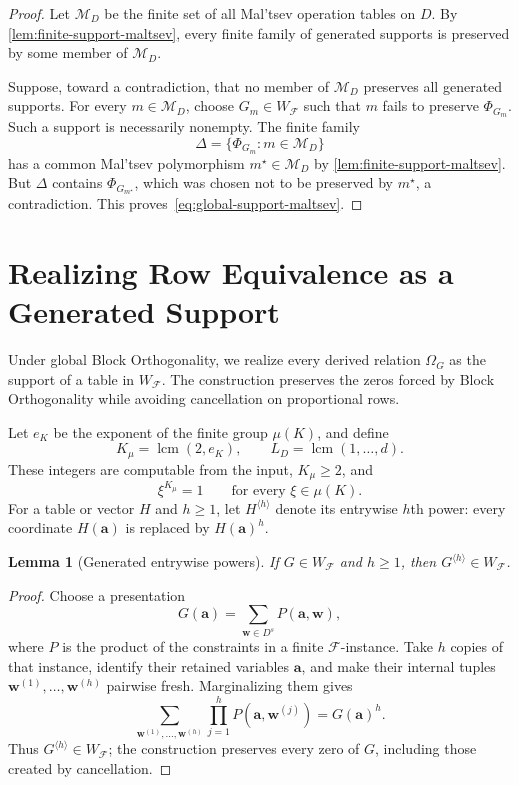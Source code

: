 \documentclass[11pt]{article}
\theoremstyle{plain}
\newtheorem{lemma}[lemma]{Lemma}
\theoremstyle{definition}
\theoremstyle{remark}
\newcommand{\cF}{\mathcal F}
\newcommand{\SuppRel}[1]{\Phi_{#1}}
\newcommand{\RowEq}[1]{\Omega_{#1}}
\newcommand{\Pow}[2]{#1^{\langle #2\rangle}}
\DeclareMathOperator{\lcm}{lcm}
\begin{document}
\begin{proof}
Let $\mathcal M_D$ be the finite set of all Mal'tsev operation tables on
$D$.  By \cref{lem:finite-support-maltsev}, every finite family of generated
supports is preserved by some member of $\mathcal M_D$.

Suppose, toward a contradiction, that no member of $\mathcal M_D$ preserves
all generated supports.  For every $m\in\mathcal M_D$, choose
$G_m\in W_{\cF}$ such that $m$ fails to preserve $\SuppRel{G_m}$.  Such a
support is necessarily nonempty.  The finite family
\[
  \Delta=\{\SuppRel{G_m}:m\in\mathcal M_D\}
\]
has a common Mal'tsev polymorphism $m^\star\in\mathcal M_D$ by
\cref{lem:finite-support-maltsev}.  But $\Delta$ contains
$\SuppRel{G_{m^\star}}$, which was chosen not to be preserved by
$m^\star$, a contradiction.  This proves~\eqref{eq:global-support-maltsev}.
\end{proof}

\section{Realizing Row Equivalence as a Generated Support}
\label{sec:omega-realization}

Under global Block Orthogonality, we realize every derived relation
$\RowEq G$ as the support of a table in $W_{\cF}$.  The construction
preserves the zeros forced by Block Orthogonality while avoiding cancellation
on proportional rows.

Let $e_K$ be the exponent of the finite group $\mu(K)$, and define
\begin{equation*}
  K_\mu=\lcm(2,e_K),
  \qquad
  L_D=\lcm(1,\ldots,d).
\end{equation*}
These integers are computable from the input, $K_\mu\ge2$, and
\begin{equation}
  \xi^{K_\mu}=1
  \qquad\text{for every }\xi\in\mu(K).
  \label{eq:Kmu-kills-torsion}
\end{equation}
For a table or vector $H$ and $h\ge1$, let $\Pow{H}{h}$ denote its entrywise
$h$th power: every coordinate $H(\mathbf a)$ is replaced by
$H(\mathbf a)^h$.

\begin{lemma}[Generated entrywise powers]
\label{lem:generated-entrywise-powers}
If $G\in W_{\cF}$ and $h\ge1$, then $\Pow{G}{h}\in W_{\cF}$.
\end{lemma}

\begin{proof}
Choose a presentation
\[
  G(\mathbf a)=\sum_{\mathbf w\in D^s}P(\mathbf a,\mathbf w),
\]
where $P$ is the product of the constraints in a finite $\cF$-instance.
Take $h$ copies of that instance, identify their retained variables
$\mathbf a$, and make their internal tuples
$\mathbf w^{(1)},\ldots,\mathbf w^{(h)}$ pairwise fresh.  Marginalizing them
gives
\[
  \sum_{\mathbf w^{(1)},\ldots,\mathbf w^{(h)}}
     \prod_{j=1}^hP(\mathbf a,\mathbf w^{(j)})
  =G(\mathbf a)^h.
\]
Thus $\Pow{G}{h}\in W_{\cF}$; the construction preserves every zero of $G$,
including those created by cancellation.
\end{proof}
\end{document}
